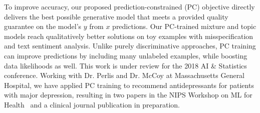 \documentclass[11pt,letterpaper]{article}
\begin{document}
To improve accuracy, our proposed prediction-constrained (PC) objective directly delivers the best possible generative model that meets a provided quality guarantee on the model's $y$ from $x$ predictions.
Our PC-trained mixture and topic models reach qualitatively better solutions on toy examples with misspecification and text sentiment analysis. Unlike purely discriminative approaches, PC training can improve predictions by including many unlabeled examples, while boosting data likelihoods as well.
This work is under review for the 2018 AI \& Statistics conference. 
Working with Dr. Perlis and Dr. McCoy at Massachusetts General Hospital, we have applied PC training to recommend antidepressants for patients with major depression, resulting in two papers in the NIPS Workshop on ML for Health~\citep{hughes2017clinicalPCsLDA, hughes2016clinicalSLDA} and a clinical journal publication in preparation.
\end{document}
